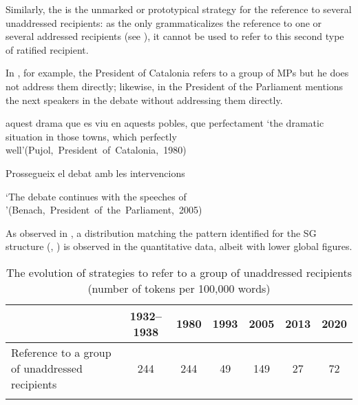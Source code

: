 \documentclass[output=paper]{langscibook}
\begin{document}
\label{2.2.2.2}

Similarly, the  is the unmarked or prototypical strategy for the reference to several unaddressed recipients: as the  only grammaticalizes the reference to one or several addressed recipients (see ), it cannot be used to refer to this second type of ratified recipient.



In , for example, the President of Catalonia refers to a group of MPs but he does not address them directly; likewise, in  the President of the Parliament mentions the next speakers in the debate without addressing them directly.



\ea\label{ex:nogue:34}
 \ea\label{ex:nogue:34a}
{{aquest drama que es viu en aquests pobles, que}  {perfectament}}
\glt `the dramatic situation in those towns, which      perfectly well'\hfill\hbox{(Pujol, President of Catalonia, 1980)}

\ex\label{ex:nogue:34b}
{{Prossegueix el debat amb les intervencions} }

\glt `The debate continues with the speeches of      '\hfill\hbox{(Benach, President of the Parliament, 2005)}
\z \z 

As observed in , a distribution matching the pattern identified for the SG structure (, ) is observed in the quantitative data, albeit with lower global figures.


\begin{table}
\begin{tabularx}{\textwidth}{Qcccccc} 
\lsptoprule
& 1932–1938 & 1980 & 1993 & 2005 & 2013 & 2020\\
\midrule
Reference to a group of unaddressed recipients & 244 & 244 & 49 & 149 & 27 & 72\\
\lspbottomrule
\end{tabularx}
\caption{The evolution of  strategies to refer to a group of unaddressed recipients (number of tokens per 100,000 words)}
\label{tab:nogue:16}
\end{table}
\end{document}
